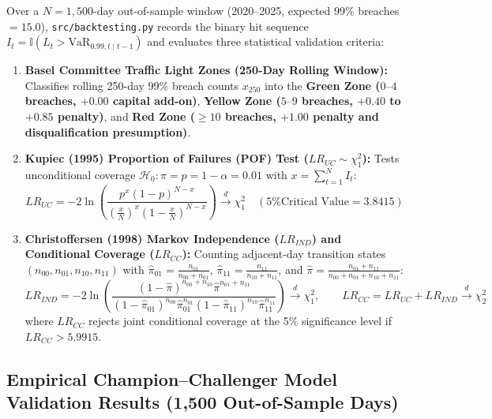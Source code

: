 \documentclass[11pt,a4paper]{article}
\begin{document}
Over a $N = 1,500$-day out-of-sample window (2020--2025, expected 99\% breaches $= 15.0$), \texttt{src/backtesting.py} records the binary hit sequence $I_t = \mathbb{I}(L_t > \text{VaR}_{0.99, t \mid t-1})$ and evaluates three statistical validation criteria:
\begin{enumerate}
    \item \textbf{Basel Committee Traffic Light Zones (250-Day Rolling Window):} Classifies rolling 250-day 99\% breach counts $x_{250}$ into the \textbf{Green Zone ($0\text{--}4$ breaches, $+0.00$ capital add-on)}, \textbf{Yellow Zone ($5\text{--}9$ breaches, $+0.40$ to $+0.85$ penalty)}, and \textbf{Red Zone ($\ge 10$ breaches, $+1.00$ penalty and disqualification presumption)}.
    \item \textbf{Kupiec (1995) Proportion of Failures (POF) Test ($LR_{UC} \sim \chi^2_1$):} Tests unconditional coverage $\mathcal{H}_0: \pi = p = 1 - \alpha = 0.01$ with $x = \sum_{t=1}^N I_t$:
    \begin{equation}
    LR_{UC} = -2\ln\left(\frac{p^x(1-p)^{N-x}}{\left(\frac{x}{N}\right)^x\left(1-\frac{x}{N}\right)^{N-x}}\right) \xrightarrow{d} \chi^2_1 \quad (\text{5\% Critical Value} = 3.8415)
    \end{equation}
    \item \textbf{Christoffersen (1998) Markov Independence ($LR_{IND}$) and Conditional Coverage ($LR_{CC}$):} Counting adjacent-day transition states $(n_{00}, n_{01}, n_{10}, n_{11})$ with $\hat{\pi}_{01} = \frac{n_{01}}{n_{00}+n_{01}}$, $\hat{\pi}_{11} = \frac{n_{11}}{n_{10}+n_{11}}$, and $\hat{\pi} = \frac{n_{01}+n_{11}}{n_{00}+n_{01}+n_{10}+n_{11}}$:
    \begin{equation}
    LR_{IND} = -2\ln\left(\frac{(1-\hat{\pi})^{n_{00}+n_{10}}\hat{\pi}^{n_{01}+n_{11}}}{(1-\hat{\pi}_{01})^{n_{00}}\hat{\pi}_{01}^{n_{01}}(1-\hat{\pi}_{11})^{n_{10}}\hat{\pi}_{11}^{n_{11}}}\right) \xrightarrow{d} \chi^2_1, \qquad LR_{CC} = LR_{UC} + LR_{IND} \xrightarrow{d} \chi^2_2
    \end{equation}
    where $LR_{CC}$ rejects joint conditional coverage at the 5\% significance level if $LR_{CC} > 5.9915$.
\end{enumerate}

\subsection{Empirical Champion--Challenger Model Validation Results (1,500 Out-of-Sample Days)}
\end{document}
